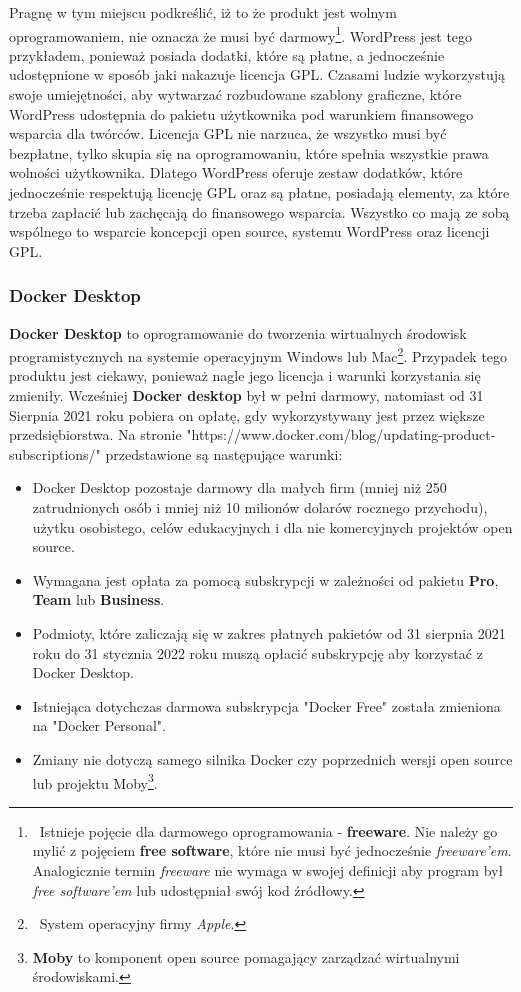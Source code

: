 \documentclass{article}
\begin{document}
Pragnę w tym miejscu podkreślić, iż to że produkt jest wolnym oprogramowaniem, nie oznacza że musi być darmowy\footnote{\, Istnieje pojęcie dla darmowego oprogramowania - \textbf{freeware}. Nie należy go mylić z pojęciem \textbf{free software}, które nie musi być jednocześnie \emph{freeware'em}. Analogicznie termin \emph{freeware} nie wymaga w swojej definicji aby program był \emph{free software'em} lub udostępniał swój kod źródłowy\cite{wiki.freeware}.}. WordPress jest tego przykładem, ponieważ posiada dodatki, które są płatne, a jednocześnie udostępnione w sposób jaki nakazuje licencja GPL. Czasami ludzie wykorzystują swoje umiejętności, aby wytwarzać rozbudowane szablony graficzne, które WordPress udostępnia do pakietu użytkownika pod warunkiem finansowego wsparcia dla twórców. Licencja GPL nie narzuca, że wszystko musi być bezpłatne, tylko skupia się na oprogramowaniu, które spełnia wszystkie prawa wolności użytkownika. Dlatego WordPress oferuje zestaw dodatków, które jednocześnie respektują licencję GPL oraz są płatne, posiadają elementy, za które trzeba zapłacić lub zachęcają do finansowego wsparcia. Wszystko co mają ze sobą wspólnego to wsparcie koncepcji open source, systemu WordPress oraz licencji GPL\cite{wordpress.commercial}.

\subsubsection{Docker Desktop}

\hspace{4mm} \textbf{Docker Desktop} to oprogramowanie do tworzenia wirtualnych środowisk programistycznych na systemie operacyjnym Windows lub Mac\footnote{\, System operacyjny firmy \emph{Apple}.}. Przypadek tego produktu jest ciekawy, ponieważ nagle jego licencja i warunki korzystania się zmieniły. Wcześniej \textbf{Docker desktop} był w pełni darmowy, natomiast od 31 Sierpnia 2021 roku pobiera on opłatę, gdy wykorzystywany jest przez większe przedsiębiorstwa. Na stronie "https://www.docker.com/blog/updating-product-subscriptions/" przedstawione są następujące warunki\cite{docker.update}:
\begin{itemize}
    \item Docker Desktop pozostaje darmowy dla małych firm (mniej niż 250 zatrudnionych osób i mniej niż 10 milionów dolarów rocznego przychodu), użytku osobistego, celów edukacyjnych i dla nie komercyjnych projektów open source.
    \item Wymagana jest opłata za pomocą subskrypcji w zależności od pakietu \textbf{Pro}, \textbf{Team} lub \textbf{Business}.
    \item Podmioty, które zaliczają się w zakres płatnych pakietów od 31 sierpnia 2021 roku do 31 stycznia 2022 roku muszą opłacić subskrypcję aby korzystać z Docker Desktop.
    \item Istniejąca dotychczas darmowa subskrypcja "Docker Free" została zmieniona na "Docker Personal".
    \item Zmiany nie dotyczą samego silnika Docker czy poprzednich wersji open source lub projektu Moby\footnote{\textbf{Moby} to komponent open source pomagający zarządzać wirtualnymi środowiskami.}.
\end{itemize}
\end{document}
